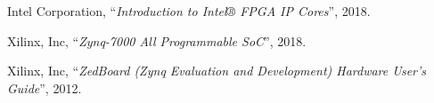 \begin{thebibliography}{1}
  Intel Corporation,
  ``\textit{Introduction to Intel® FPGA IP Cores}'',
  2018.

  Xilinx, Inc,
  ``\textit{Zynq-7000 All Programmable SoC}'',
  2018.

  Xilinx, Inc,
  ``\textit{ZedBoard (Zynq Evaluation and Development) Hardware User's Guide}'',
  2012.
\end{thebibliography}